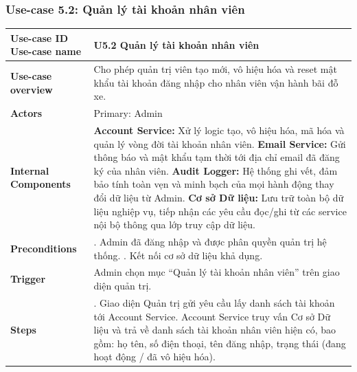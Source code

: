 
\subsubsection{Use-case 5.2: Quản lý tài khoản nhân viên}
\vspace{0.5cm}
\noindent
{\small
\renewcommand{\arraystretch}{0.95}
\begin{longtable}{|>{\raggedright\arraybackslash}p{4cm}|>{\raggedright\arraybackslash}p{11.5cm}|}
\hline
\textbf{Use-case ID} \newline \textbf{Use-case name} & U5.2 \newline \textbf{Quản lý tài khoản nhân viên} \\ \hline
\endhead
\textbf{Use-case overview} & Cho phép quản trị viên tạo mới, vô hiệu hóa và reset mật khẩu tài khoản đăng nhập cho nhân viên vận hành bãi đỗ xe. \\ \hline
\textbf{Actors} & Primary: Admin \\ \hline
\textbf{Internal Components} &
\textbf{Account Service:} Xử lý logic tạo, vô hiệu hóa, mã hóa và quản lý vòng đời tài khoản nhân viên. \newline
\textbf{Email Service:} Gửi thông báo và mật khẩu tạm thời tới địa chỉ email đã đăng ký của nhân viên. \newline
\textbf{Audit Logger:} Hệ thống ghi vết, đảm bảo tính toàn vẹn và minh bạch của mọi hành động thay đổi dữ liệu từ Admin. \newline
\textbf{Cơ sở Dữ liệu:} Lưu trữ toàn bộ dữ liệu nghiệp vụ, tiếp nhận các yêu cầu đọc/ghi từ các service nội bộ thông qua lớp truy cập dữ liệu. \\ \hline
\textbf{Preconditions} &
1. Admin đã đăng nhập và được phân quyền quản trị hệ thống. \newline
2. Kết nối cơ sở dữ liệu khả dụng. \\ \hline
\textbf{Trigger} & Admin chọn mục ``Quản lý tài khoản nhân viên'' trên giao diện quản trị. \\ \hline
\textbf{Steps} &
1. Giao diện Quản trị gửi yêu cầu lấy danh sách tài khoản tới Account Service. Account Service truy vấn Cơ sở Dữ liệu và trả về danh sách tài khoản nhân viên hiện có, bao gồm: họ tên, số điện thoại, tên đăng nhập, trạng thái (đang hoạt động / đã vô hiệu hóa). \newline

\end{longtable}}
